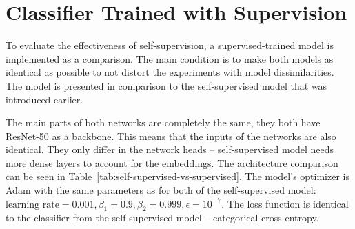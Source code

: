 \newpage\section{\label{sec:supervised-classifier}Classifier Trained with Supervision}

To evaluate the effectiveness of self-supervision, a supervised-trained model is implemented as a comparison. The main condition is to make both models as identical as possible to not distort the experiments with model dissimilarities. The model is presented in comparison to the self-supervised model that was introduced earlier.

The main parts of both networks are completely the same, they both have ResNet-50 as a backbone. This means that the inputs of the networks are also identical. They only differ in the network heads -- self-supervised model needs more dense layers to account for the embeddings. The architecture comparison can be seen in Table~\ref{tab:self-supervised-vs-supervised}. The model's optimizer is Adam with the same parameters as for both of the self-supervised model: $\text{learning rate} = 0.001, \beta_1 = 0.9, \beta_2 = 0.999, \epsilon = 10^{-7}$. The loss function is identical to the classifier from the self-supervised model -- categorical cross-entropy.

